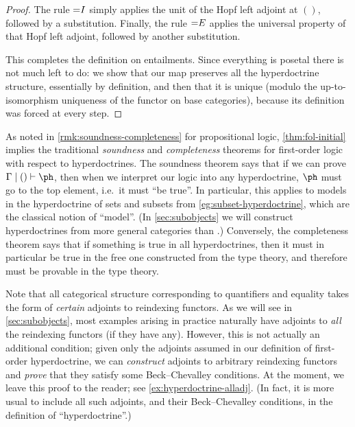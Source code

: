 \begin{proof}
  The rule $\mathord{=}I$ simply applies the unit of the Hopf left adjoint at $()$, followed by a substitution.
  Finally, the rule $\mathord{=}E$ applies the universal property of that Hopf left adjoint, followed by another substitution.

  This completes the definition on entailments.
  Since everything is posetal there is not much left to do: we show that our map preserves all the hyperdoctrine structure, essentially by definition, and then that it is unique (modulo the up-to-isomorphism uniqueness of the functor on base categories), because its definition was forced at every step.
\end{proof}

\begin{rmk}\label{rmk:fol-soundness-completeness}
  As noted in \cref{rmk:soundness-completeness} for propositional logic, \cref{thm:fol-initial} implies the traditional \emph{soundness} and \emph{completeness} theorems for first-order logic with respect to hyperdoctrines.
  The soundness theorem says that if we can prove $\Gamma\cb ()\types \ph$, then when we interpret our logic into any hyperdoctrine, $\ph$ must go to the top element, i.e.\ it must ``be true''.
  In particular, this applies to models in the hyperdoctrine of sets and subsets from \cref{eg:subset-hyperdoctrine}, which are the classical notion of ``model''.
  (In \cref{sec:subobjects} we will construct hyperdoctrines from more general categories than \bSet.)
  Conversely, the completeness theorem says that if something is true in all hyperdoctrines, then it must in particular be true in the free one constructed from the type theory, and therefore must be provable in the type theory.
\end{rmk}

\begin{rmk}
  Note that all categorical structure corresponding to quantifiers and equality takes the form of \emph{certain} adjoints to reindexing functors.
  As we will see in \cref{sec:subobjects}, most examples arising in practice naturally have adjoints to \emph{all} the reindexing functors (if they have any).
  However, this is not actually an additional condition; given only the adjoints assumed in our definition of first-order hyperdoctrine, we can \emph{construct} adjoints to arbitrary reindexing functors and \emph{prove} that they satisfy some Beck--Chevalley conditions.
  At the moment, we leave this proof to the reader; see \cref{ex:hyperdoctrine-alladj}.
  (In fact, it is more usual to include all such adjoints, and their Beck--Chevalley conditions, in the definition of ``hyperdoctrine''.)
\end{rmk}


